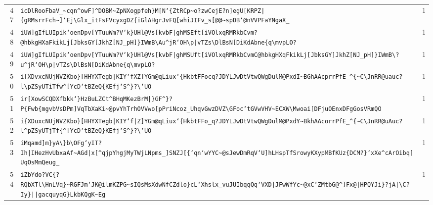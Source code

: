 \begin{xltabular}{\textwidth}{@{} r >{\raggedright\arraybackslash}X r @{}}
        47 & \texttt{icDlRooFbaV\_\textasciitilde{}cqn\textasciicircum{}owF]\textasciicircum{}DOBM\textasciitilde{}ZpNXogpfeh\}M[N`\{ZtRCp\textasciitilde{}o?zwCejE?n]egU[KRPZ|\{gRMsrrFch\textasciitilde{}]`Ej\textbackslash{}Glx\_itFsFVcyxgDZ\{iGlAHgrJvFQ[whiJIFv\_s[@@\textasciitilde{}spDB`@nVVPFaYNgaX\_} & 1 \\
        48 & \texttt{iUW]gIfLUIpik`oenDpv[YTuuWm?V`k\}UHl@Vs[kvbF|ghMSEft[iVOlxqRMRkbCvm?@hbkgHXaFkikLj[JbksGY[JkhZ[NJ\_pH]\}IWmB\textbackslash{}Au\textasciicircum{}jR`OH\textbackslash{}p|vTZs\textbackslash{}DlBsN[DiKdAbne\{q\textbackslash{}mvpLO?} & 1 \\
        49 & \texttt{iUW]gIfLUIpik`oenDpv[YTuuWm?V`k\}UHl@Vs[kvbF|ghMSUft[iVOlxqRMRkbCvmC@hbkgHXqFkikLj[JbksGY]JkhZ[NJ\_pH]\}IWmB\textbackslash{}?u\textasciicircum{}jR`OH\textbackslash{}p|vTZs\textbackslash{}DlBsN[DiKdAbne\{q\textbackslash{}mvpLO?} & 1 \\
        50 & \texttt{i[XDvxcNUjNVZKbo\}[HHYXTegb|KIY`fXZ]YGm@qLiux`\{HkbtFFocq?JDYLJwDtVtwQWgDulM@PxdI\textasciitilde{}BGhAAcprrPfE\_\textasciicircum{}\{\textasciitilde{}C\textbackslash{}JnRR@uauc?l\textbackslash{}pZSyUTiTfw\textasciicircum{}[YcD`tBZeQ\{KEfj`S\textasciicircum{}\}?\textbackslash{}`UO} & 1 \\
        51 & \texttt{ir[XowSCQDXfbkk`\}HzBuLZCt\textasciicircum{}BHqMKezBrM|\}GF\textasciicircum{}\}?P\{Fwb\{mgvbVsDPm]VqTbXaKi\textasciitilde{}@pvYhTrhOVVwo[pPriNcoz\_UhqvGwzDVZ\textbackslash{}GFoc`tGVwVHV\textasciitilde{}ECXW\textbackslash{}Mwoai[DFjuOEnxDFgGosVRmQO} & 1 \\
        52 & \texttt{i\{XDuxcNUjNVZKbo\}[HHYXTegb|KIY`f|Z]YGm@qLiux`\{HkbtFFo\_q?JDYLJwDtVtwQWgDulM@PxdY\textasciitilde{}BkhAAcorrPfE\_\textasciicircum{}\{\textasciitilde{}C\textbackslash{}JnRR@uAuc?l\textasciicircum{}pZSyUTjTf\{\textasciicircum{}[YcD`tBZeQ\}KEfj`S\textasciicircum{}\}?\textbackslash{}`UO} & 1 \\
        53 & \texttt{iMqamd]m\}yA\textbackslash{}\}b\textbackslash{}OFg`yIT?Ih|IHezHvUbxaAf\textasciitilde{}AGd|x[\textasciicircum{}qjpYhgjMyTWjLNpms\_]SNZJ[\{`qn`wYYC\textasciitilde{}@sJewDmRqV`U]hLHspTfSrowyKXypMBfKUz\{DCM?\}`xXe\textasciicircum{}cArOibq[UqOsMmQeug\_} & 1 \\
        54 & \texttt{iZbYdo?VC\{?RQbXTl\textbackslash{}HnLVq\}\textasciitilde{}RGFJm`JK@ilmKZPG\textasciitilde{}sIQsMsXdwNfCZdlo\}cL`Xhslx\_vuJUIbqqQq`VXD|JFwWfYc\textasciitilde{}@xC`ZMtbG@\textasciicircum{}]Fx@|HPQYJi\}?jA|\textbackslash{}C?Iy\}||gacquyqG\}LkbKQgK\textasciitilde{}Eg} & 1 \\

\end{xltabular}
